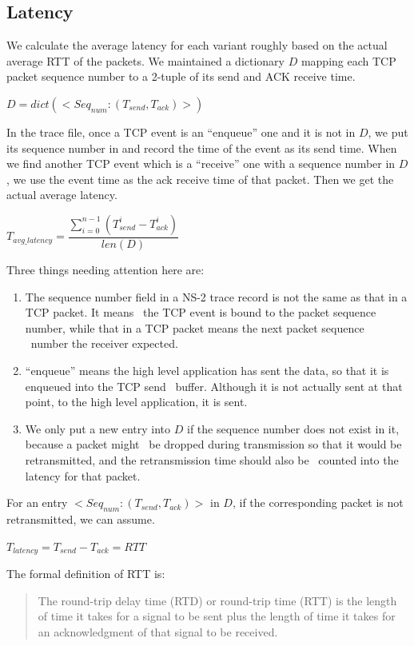 \documentclass[10pt, conference]{lib/IEEEtran}
\begin{document}
\subsection{Latency}
We calculate the average latency for each variant roughly based on the actual average RTT of the packets. 
We maintained a dictionary $D$ mapping each TCP packet sequence number to a 2-tuple of its send and ACK 
receive time.
\begin{center}
    $D = dict(<Seq_{num} : (T_{send}, T_{ack})>)$
\end{center}
In the trace file, once a TCP event is an ``enqueue'' one and it is not in $D$, we put its sequence number in 
and record the time of the event as its send time. When we find another TCP event which is a ``receive'' one 
with a sequence number in $D$, we use the event time as the ack receive time of that packet. Then we get 
the actual average latency.
\begin{center}
    $T_{avg\_latency} = \dfrac{\sum_{i = 0}^{n - 1} (T_{send}^i - T_{ack}^i)}{len(D)}$
\end{center}
Three things needing attention here are:
\begin{enumerate}
    \item The sequence number field in a NS-2 trace record is not the same as that in a TCP packet. It means \
the TCP event is bound to the packet sequence number, while that in a TCP packet means the next packet sequence \
number the receiver expected.
    \item ``enqueue'' means the high level application has sent the data, so that it is enqueued into the TCP send \
buffer. Although it is not actually sent at that point, to the high level application, it is sent.
    \item We only put a new entry into $D$ if the sequence number does not exist in it, because a packet might \
be dropped during transmission so that it would be retransmitted, and the retransmission time should also be \
counted into the latency for that packet.
\end{enumerate}
For an entry $<Seq_{num} : (T_{send}, T_{ack})>$ in $D$, if the corresponding packet is not retransmitted, we 
can assume.
\begin{center}
$T_{latency} = T_{send} - T_{ack} = RTT$
\end{center}
The formal definition of RTT is:
\begin{quote}
The round-trip delay time (RTD) or round-trip time (RTT) is the length of time it takes for a signal to be 
sent plus the length of time it takes for an acknowledgment of that signal to be received.
\end{quote}
\end{document}
